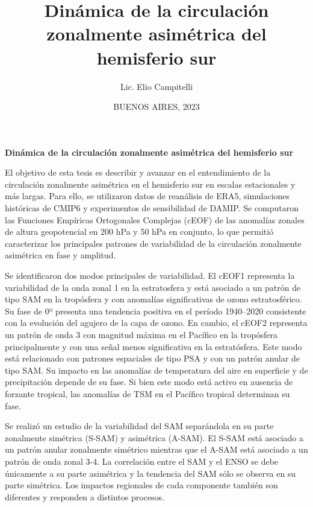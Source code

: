 \documentclass[12pt,oneside,a4paper]{reedthesis}
\title{Dinámica de la circulación zonalmente asimétrica del hemisferio sur}
\author{Lic. Elio Campitelli}
\date{BUENOS AIRES, 2023}
\begin{document}
  \maketitle

\frontmatter %
\pagestyle{empty} %


  \begin{resumen}
    \textbf{Dinámica de la circulación zonalmente asimétrica del hemisferio sur}

    El objetivo de esta tesis es describir y avanzar en el entendimiento de la circulación zonalmente asimétrica en el hemisferio sur en escalas estacionales y más largas.
    Para ello, se utilizaron datos de reanálisis de ERA5, simulaciones históricas de CMIP6 y experimentos de sensibilidad de DAMIP.
    Se computaron las Funciones Empíricas Ortogonales Complejas (cEOF) de las anomalías zonales de altura geopotencial en 200 hPa y 50 hPa en conjunto, lo que permitió caracterizar los principales patrones de variabilidad de la circulación zonalmente asimétrica en fase y amplitud.

    Se identificaron dos modos principales de variabilidad.
    El cEOF1 representa la variabilidad de la onda zonal 1 en la estratosfera y está asociado a un patrón de tipo SAM en la tropósfera y con anomalías significativas de ozono estratosférico.
    Su fase de 0º presenta una tendencia positiva en el período 1940--2020 consistente con la evolución del agujero de la capa de ozono.
    En cambio, el cEOF2 representa un patrón de onda 3 con magnitud máxima en el Pacífico en la tropósfera principalmente y con una señal menos significativa en la estratósfera.
    Este modo está relacionado con patrones espaciales de tipo PSA y con un patrón anular de tipo SAM.
    Su impacto en las anomalías de temperatura del aire en superficie y de precipitación depende de su fase.
    Si bien este modo está activo en ausencia de forzante tropical, las anomalías de TSM en el Pacífico tropical determinan su fase.

    Se realizó un estudio de la variabilidad del SAM separándola en su parte zonalmente simétrica (S-SAM) y asimétrica (A-SAM).
    El S-SAM está asociado a un patrón anular zonalmente simétrico mientras que el A-SAM está asociado a un patrón de onda zonal 3-4.
    La correlación entre el SAM y el ENSO se debe únicamente a su parte asimétrica y la tendencia del SAM sólo se observa en su parte simétrica.
    Los impactos regionales de cada componente también son diferentes y responden a distintos procesos.


\end{resumen}
\end{document}
